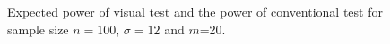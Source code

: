 \documentclass[12pt]{article}
\begin{document}
\begin{figure}[hbtp]
   \centering
       \caption{Expected power of visual test  and the power of conventional test for sample size $n =100$, $\sigma = 12$ and $m$=20. }
       \label{fig:power_expected}
\end{figure}





%
\end{document}
